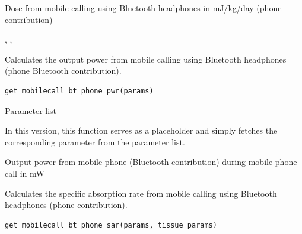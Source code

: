 \documentclass[a4paper]{book}
\begin{document}
%
\begin{Value}
Dose from mobile calling using Bluetooth headphones in mJ/kg/day (phone contribution)
\end{Value}
%
\begin{SeeAlso}
, , 
\end{SeeAlso}
%
\begin{Description}
Calculates the output power from mobile calling using Bluetooth headphones (phone Bluetooth contribution).
\end{Description}
%
\begin{Usage}
\begin{verbatim}
get_mobilecall_bt_phone_pwr(params)
\end{verbatim}
\end{Usage}
%
\begin{Arguments}
\begin{ldescription}
\item[\code{params}] Parameter list
\end{ldescription}
\end{Arguments}
%
\begin{Details}
In this version, this function serves as a placeholder and simply fetches the corresponding parameter from the parameter list.
\end{Details}
%
\begin{Value}
Output power from mobile phone (Bluetooth contribution) during mobile phone call in mW
\end{Value}
%
\begin{Description}
Calculates the specific absorption rate from mobile calling using Bluetooth headphones (phone contribution).
\end{Description}
%
\begin{Usage}
\begin{verbatim}
get_mobilecall_bt_phone_sar(params, tissue_params)
\end{verbatim}
\end{Usage}
\end{document}
